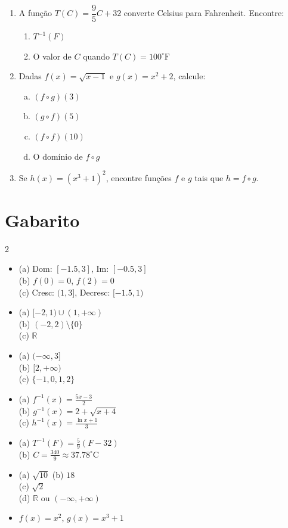\documentclass[12pt,a4paper]{article}
\begin{document}
\begin{enumerate}
\item A função $T(C) = \dfrac{9}{5}C + 32$ converte Celsius para Fahrenheit. Encontre:
\begin{enumerate}
    \item $T^{-1}(F)$
    \item O valor de $C$ quando $T(C) = 100^\circ\text{F}$
\end{enumerate}

\item Dadas $f(x) = \sqrt{x-1}$ e $g(x) = x^2 + 2$, calcule:
\begin{enumerate}[a)]
    \item $(f \circ g)(3)$
    \item $(g \circ f)(5)$
    \item $(f \circ f)(10)$
    \item O domínio de $f \circ g$
\end{enumerate}

\item Se $h(x) = (x^3 + 1)^2$, encontre funções $f$ e $g$ tais que $h = f \circ g$.

\end{enumerate}

\section*{Gabarito}

\begin{multicols}{2}
\begin{itemize}

\item[1.] 
(a) Dom: $[-1.5, 3]$, Im: $[-0.5, 3]$ \\
(b) $f(0)=0$, $f(2)=0$ \\
(c) Cresc: $(1, 3]$, Decresc: $[-1.5, 1)$

\item[2.] 
(a) $[-2,1) \cup (1,+\infty)$ \\
(b) $(-2,2)\setminus\{0\}$ \\
(c) $\mathbb{R}$

\item[3.] 
(a) $(-\infty, 3]$ \\
(b) $[2,+\infty)$ \\
(c) $\{-1,0,1,2\}$

\item[4.] 
(a) $f^{-1}(x)=\frac{5x-3}{2}$ \\
(b) $g^{-1}(x)=2+\sqrt{x+4}$ \\
(c) $h^{-1}(x)=\frac{\ln x+1}{3}$

\item[5.] 
(a) $T^{-1}(F)=\frac{5}{9}(F-32)$ \\
(b) $C = \frac{340}{9} \approx 37.78^\circ\text{C}$

\item[6.] 
(a) $\sqrt{10}$ \quad (b) $18$ \\
(c) $\sqrt{2}$ \\
(d) $\mathbb{R}$ ou $(-\infty, +\infty)$

\item[7.] 
$f(x)=x^2$, $g(x)=x^3+1$

\end{itemize}
\end{multicols}
\end{document}
